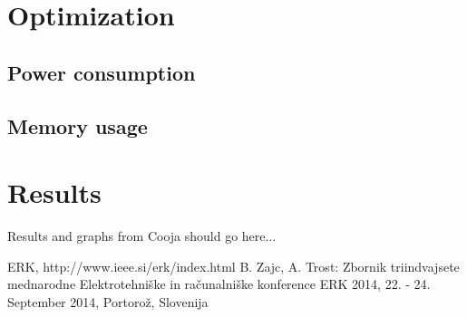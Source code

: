 \documentclass[a4paper]{article}
\begin{document}
\section{Optimization}
\subsection{Power consumption}
\subsection{Memory usage}
\section{Results}
Results and graphs from Cooja should go here...
\small
\begin{thebibliography}{1}

 ERK, http://www.ieee.si/erk/index.html 
 B. Zajc, A. Trost: Zbornik triindvajsete mednarodne Elektrotehniške in računalniške konference ERK 2014, 22. - 24. September 2014, Portorož, Slovenija

\end{thebibliography}
\end{document}
